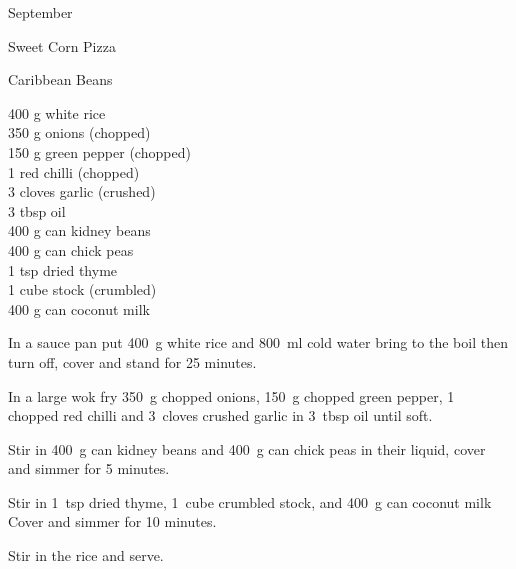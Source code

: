 \begin{menu}{September}
\begin{recipe}{2}{Sweet Corn Pizza}
\begin{instructions}
    \end{instructions}
    \end{recipe}%
  
    \begin{recipe}{2}{Caribbean Beans}%
		\begin{ingredients}
		400 g white rice  \\
	350 g onions (chopped) \\
	150 g green pepper (chopped) \\
	1  red chilli (chopped) \\
	3 cloves garlic (crushed) \\
	3 tbsp oil  \\
	400 g can kidney beans  \\
	400 g can chick peas  \\
	1 tsp dried thyme  \\
	1 cube stock (crumbled) \\
	400 g can coconut milk  \\
	
		\end{ingredients}
	
	
    \begin{instructions}
    \item 
      In a
      sauce pan
      put
      400~g  white rice
      and
      800~ml  cold water
      bring to the boil then turn off, cover and stand for 25 minutes.
    \item 
        In a large wok fry
        350~g chopped onions,
        150~g chopped green pepper,
        1~ chopped red chilli
        and
        3~cloves crushed garlic
        in
        3~tbsp  oil
        until soft.
      \item 
        Stir in
        400~g  can kidney beans
        and
        400~g  can chick peas
        in their liquid,
        cover and simmer for 5 minutes.
      \item 
        Stir in
        1~tsp  dried thyme,
        1~cube crumbled stock,
        and
        400~g  can coconut milk
        Cover and simmer for 10 minutes.
      \item 
        Stir in the rice and serve.
      
    \end{instructions}
    \end{recipe}%
  

\end{menu}
